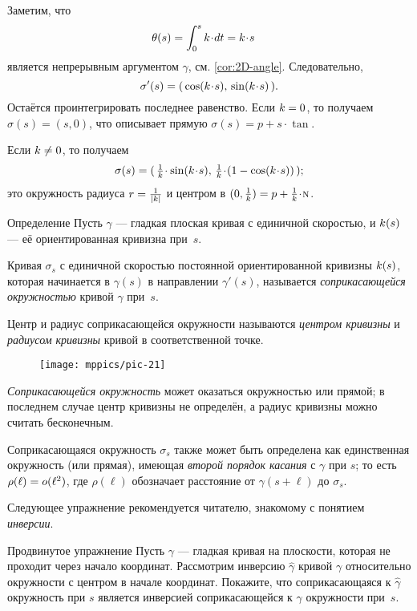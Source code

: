 Заметим, что
\begin{align*}\theta(s)&=\int_{0}^s\skur\cdot dt=\skur\cdot s
\end{align*}
является непрерывным аргументом $\gamma$, см. \ref{cor:2D-angle}.
Следовательно,
\[\sigma'(s)=(\,\cos(\skur\cdot s),\,\sin(\skur\cdot s)\,).\]
Остаётся проинтегрировать последнее равенство.
Если $k=0$, то получаем $\sigma(s)=(s,0)$,
что описывает прямую $\sigma(s)=p+s\cdot \tan$.

Если $k\ne 0$, то получаем
\[\sigma(s)=(\,\tfrac1\skur\cdot\sin(\skur\cdot s),\, \tfrac1\skur\cdot(1-\cos(\skur\cdot s))\,);\]
это окружность радиуса $r=\tfrac1{|k|}$ и центром в $(0,\tfrac1\skur)=p+\tfrac1\skur\cdot\norm$.
\qeds

\begin{thm}{Определение}
Пусть $\gamma$ --- гладкая плоская кривая с единичной скоростью,
и $k(s)$ --- её ориентированная кривизна при~$s$.

Кривая $\sigma_s$ с единичной скоростью постоянной ориентированной кривизны $k(s)$, которая начинается в $\gamma(s)$ в направлении $\gamma'(s)$, называется \emph{соприкасающейся окружностью} кривой $\gamma$ при~$s$.

Центр и радиус соприкасающейся окружности называются \emph{центром кривизны} и \emph{радиусом кривизны} кривой в соответственной точке.
\end{thm}

{

\begin{wrapfigure}{o}{31 mm}
\vskip-0mm
\centering
\texttt{[image: mppics/pic-21]}
\vskip0mm
\end{wrapfigure}

\textit{Соприкасающейся окружность} может оказаться окружностью или прямой;
в последнем случае центр кривизны не определён, а радиус кривизны можно считать бесконечным.  

Соприкасающаяся окружность $\sigma_s$ также может быть определена как единственная окружность (или прямая), имеющая \emph{второй порядок касания} с $\gamma$ при $s$;
то есть $\rho(\ell)\z=o(\ell^2)$, где $\rho(\ell)$ обозначает расстояние от $\gamma(s+\ell)$ до $\sigma_s$.

Следующее упражнение рекомендуется читателю, знакомому с понятием \emph{инверсии}.

}

\begin{thm}{Продвинутое упражнение}\label{ex:inverse}
Пусть $\gamma$ --- гладкая кривая на плоскости, которая не проходит через начало координат.
Рассмотрим инверсию $\hat \gamma$ кривой $\gamma$ относительно окружности с центром в начале координат.
Покажите, что соприкасающаяся к $\hat\gamma$ окружность при $s$ является инверсией соприкасающейся к $\gamma$ окружности  при~$s$.
\end{thm}

